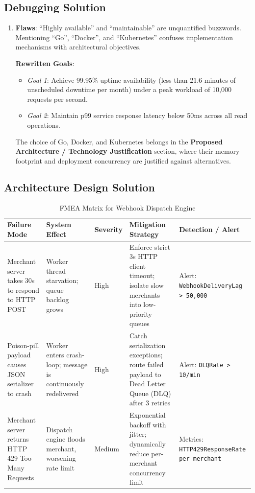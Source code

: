 \subsection*{Debugging Solution}
\begin{enumerate}[leftmargin=18pt]
  \item \textbf{Flaws}: ``Highly available'' and ``maintainable'' are unquantified buzzwords. Mentioning ``Go'', ``Docker'', and ``Kubernetes'' confuses implementation mechanisms with architectural objectives.
  
  \textbf{Rewritten Goals}:
  \begin{itemize}
    \item \textit{Goal 1}: Achieve 99.95\% uptime availability (less than 21.6 minutes of unscheduled downtime per month) under a peak workload of 10,000 requests per second.
    \item \textit{Goal 2}: Maintain p99 service response latency below 50ms across all read operations.
  \end{itemize}
  The choice of Go, Docker, and Kubernetes belongs in the \textbf{Proposed Architecture / Technology Justification} section, where their memory footprint and deployment concurrency are justified against alternatives.
\end{enumerate}

\subsection*{Architecture Design Solution}
\begin{table}[htbp]
\centering\scriptsize
\begin{tabular}{p{2.5cm}p{2.8cm}p{1.2cm}p{2.8cm}p{2.8cm}}
\toprule
\textbf{Failure Mode} & \textbf{System Effect} & \textbf{Severity} & \textbf{Mitigation Strategy} & \textbf{Detection / Alert} \\
\midrule
Merchant server takes 30s to respond to HTTP POST & Worker thread starvation; queue backlog grows & High & Enforce strict 3s HTTP client timeout; isolate slow merchants into low-priority queues & Alert: \texttt{WebhookDeliveryLag > 50,000} \\
Poison-pill payload causes JSON serializer to crash & Worker enters crash-loop; message is continuously redelivered & High & Catch serialization exceptions; route failed payload to Dead Letter Queue (DLQ) after 3 retries & Alert: \texttt{DLQRate > 10/min} \\
Merchant server returns HTTP 429 Too Many Requests & Dispatch engine floods merchant, worsening rate limit & Medium & Exponential backoff with jitter; dynamically reduce per-merchant concurrency limit & Metrics: \texttt{HTTP429ResponseRate per merchant} \\
\bottomrule
\end{tabular}
\caption{FMEA Matrix for Webhook Dispatch Engine}
\end{table}

